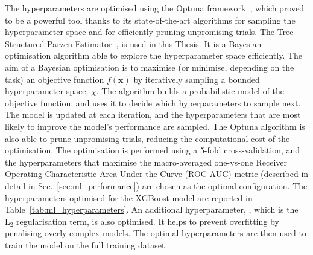 The hyperparameters are optimised using the Optuna framework~\cite{akiba2019optuna}, which proved to be a powerful tool thanks to its state-of-the-art algorithms for sampling the hyperparameter space and for efficiently pruning unpromising trials. The Tree-Structured Parzen Estimator~\cite{bergstra2011algorithms}, is used in this Thesis. It is a Bayesian optimisation algorithm able to explore the hyperparameter space efficiently. The aim of a Bayesian optimisation is to maximise (or minimise, depending on the task) an objective function $f(\mathbf{x})$ by iteratively sampling a bounded hyperparameter space, $\chi$. The algorithm builds a probabilistic model of the objective function, and uses it to decide which hyperparameters to sample next. The model is updated at each iteration, and the hyperparameters that are most likely to improve the model's performance are sampled. The Optuna algorithm is also able to prune unpromising trials, reducing the computational cost of the optimisation. The optimisation is performed using a 5-fold cross-validation, and the hyperparameters that maximise the macro-averaged one-vs-one Receiver Operating Characteristic Area Under the Curve (ROC AUC) metric (described in detail in Sec.~\ref{sec:ml_performance}) are chosen as the optimal configuration. The hyperparameters optimised for the XGBoost model are reported in Table~\ref{tab:ml_hyperparameters}. An additional hyperparameter, , which is the $\mathrm{L_2}$ regularisation term, is also optimised. It helps to prevent overfitting by penalising overly complex models. The optimal hyperparameters are then used to train the model on the full training dataset.

